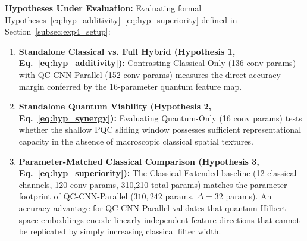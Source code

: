 \documentclass[pdflatex,sn-mathphys-num]{sn-jnl}%
\theoremstyle{thmstyleone}%
\theoremstyle{thmstyletwo}%
\theoremstyle{thmstylethree}%
\begin{document}
\textbf{Hypotheses Under Evaluation:}
Evaluating formal Hypotheses~\eqref{eq:hyp_additivity}--\eqref{eq:hyp_superiority} defined in Section~\ref{subsec:exp4_setup}:
\begin{enumerate}
    \item \textbf{Standalone Classical vs. Full Hybrid (Hypothesis 1, Eq.~\eqref{eq:hyp_additivity}):} Contrasting Classical-Only (136 conv params) with QC-CNN-Parallel (152 conv params) measures the direct accuracy margin conferred by the 16-parameter quantum feature map.
    \item \textbf{Standalone Quantum Viability (Hypothesis 2, Eq.~\eqref{eq:hyp_synergy}):} Evaluating Quantum-Only (16 conv params) tests whether the shallow PQC sliding window possesses sufficient representational capacity in the absence of macroscopic classical spatial textures.
    \item \textbf{Parameter-Matched Classical Comparison (Hypothesis 3, Eq.~\eqref{eq:hyp_superiority}):} The Classical-Extended baseline (12 classical channels, 120 conv params, 310,210 total params) matches the parameter footprint of QC-CNN-Parallel ($310,242$ params, $\Delta = 32$ params). An accuracy advantage for QC-CNN-Parallel validates that quantum Hilbert-space embeddings encode linearly independent feature directions that cannot be replicated by simply increasing classical filter width.
\end{enumerate}

\begin{table}[htbp]
\centering
\caption{Experiment 4: Multi-Branch Ablation Study Specifications and Benchmark Accuracies}
\label{tab:ablation_results}
\renewcommand{\arraystretch}{1.1}
\end{table}
\end{document}
